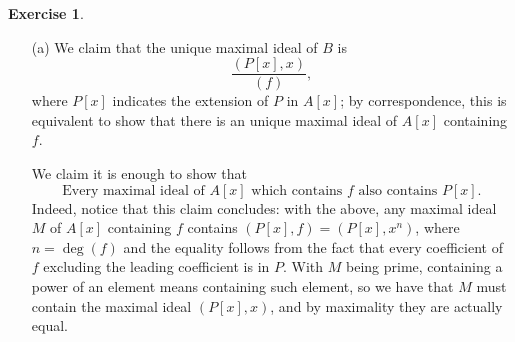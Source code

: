 \documentclass[a4paper]{article}
\theoremstyle{definition}
\theoremstyle{definition}
\theoremstyle{remark}
\theoremstyle{definition}
\newtheorem{exercise}{Exercise}[section]
\begin{document}
\begin{exercise}\

	\begin{itemize}
		\item[(a)] We claim that the unique maximal ideal of $B$ is $$\frac{(P[x],x)}{(f)},$$ where $P[x]$ indicates the extension of $P$ in $A[x]$; by correspondence, this is equivalent to show that there is an unique maximal ideal of
	$A[x]$ containing $f$.

	We claim it is enough to show that
	\begin{equation}\label{eq:claim}
		\text{Every maximal ideal of }A[x]\text{ which contains }f\text{ also contains }P[x].
	\end{equation}
	Indeed, notice that this claim concludes: with the above, any maximal ideal $M$ of $A[x]$ containing $f$ contains $(P[x],f)=(P[x],x^n)$, where $n=\operatorname{deg}{(f)}$
	and the equality follows from the
	fact that every coefficient of $f$
	excluding the leading coefficient is in $P$. With $M$ being prime, containing a power of an element means containing such element, so we have that $M$ must contain the
	maximal ideal
	$\left( P[x],x \right) $, and by maximality they are actually equal.


\end{itemize}
\end{exercise}
\end{document}
